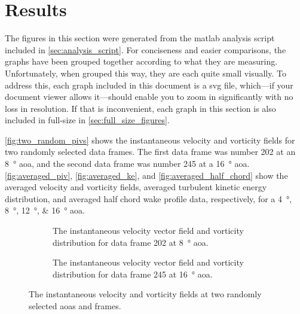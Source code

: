 \chapter{Results}
\label{cp:results}

The figures in this section were generated from the \acrshort{matlab} analysis script included in \autoref{sec:analysis_script}. For conciseness and easier comparisons, the graphs have been grouped together according to what they are measuring. Unfortunately, when grouped this way, they are each quite small visually. To address this, each graph included in this document is a \acrfull{svg} file, which—if your document viewer allows it—should enable you to zoom in significantly with no loss in resolution. If that is inconvenient, each graph in this section is also included in full-size in \autoref{sec:full_size_figures}.

\autoref{fig:two_random_pivs} shows the instantaneous velocity and vorticity fields for two randomly selected data frames. The first data frame was number \num{202} at an \qty{8}{\degree} \acrshort{aoa}, and the second data frame was number \num{245} at a \qty{16}{\degree} \acrshort{aoa}. \autoref{fig:averaged_piv}, \autoref{fig:averaged_ke}, and \autoref{fig:averaged_half_chord} show the averaged velocity and vorticity fields, averaged turbulent kinetic energy distribution, and averaged half chord wake profile data, respectively, for a \qtylist{4;8;12;16}{\degree} \acrshort{aoa}.

\begin{figure}[htbp]
    \centering
    \begin{subfigure}{0.49\textwidth}
        \centering
        
        \caption{The instantaneous velocity vector field and vorticity distribution for data frame \num{202} at \qty{8}{\degree} \acrshort{aoa}.}
        \label{fig:instant_aoa8}
    \end{subfigure}
    \begin{subfigure}{0.49\textwidth}
        \centering
        
        \caption{The instantaneous velocity vector field and vorticity distribution for data frame \num{245} at \qty{16}{\degree} \acrshort{aoa}.}
        \label{fig:instant_aoa16}
    \end{subfigure}
    \caption{The instantaneous velocity and vorticity fields at two randomly selected \acrshort{aoa}s and frames.}
    \label{fig:two_random_pivs}
\end{figure}

